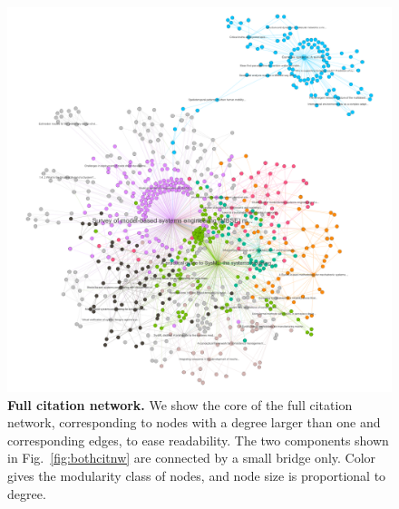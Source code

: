 \documentclass[runningheads,a4paper]{llncs}
\begin{document}
\begin{figure}[h!]
	\includegraphics[width=\linewidth]{core.png}
	\caption{\textbf{Full citation network.} We show the core of the full citation network, corresponding to nodes with a degree larger than one and corresponding edges, to ease readability. The two components shown in Fig.~\ref{fig:bothcitnw} are connected by a small bridge only. Color gives the modularity class of nodes, and node size is proportional to degree.\label{fig:citnw}}
\end{figure}


\end{document}
